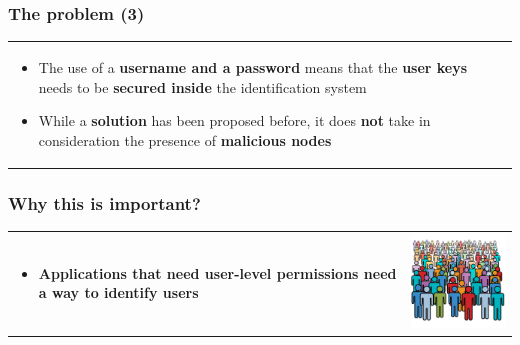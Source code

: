 \begin{frame}
\frametitle{The problem (3)}
\begin{table}
\begin{tabular}{p{7cm}p{3cm}}
\begin{itemize}
  \item The use of a \textbf{username and a password} means that the \textbf{user keys} needs to be \textbf{secured inside} the identification system
  \item While a \textbf{solution} has been proposed before, it does \textbf{not} take in
consideration the presence of \textbf{malicious nodes}
\end{itemize}
&
\vspace{1.5cm}
\end{tabular}
\end{table}
\end{frame}

\begin{frame}
\frametitle{Why this is important?}
\begin{table}
\begin{tabular}{p{7cm}p{3cm}}
\begin{itemize}
  \item \textbf{Applications that need user-level permissions need a way to identify users}
\end{itemize}
&
\vspace{1.5cm}
\includegraphics[width=4cm]{img/users}\\
\end{tabular}
\end{table}
\end{frame}



